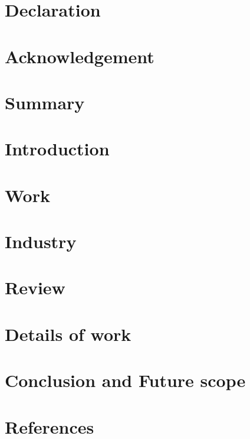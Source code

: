 \documentclass[12pt]{report}
\begin{document}




\chapter*{Declaration}


\chapter*{Acknowledgement}



\tableofcontents
\listoffigures

\clearpage
{}

\chapter{Summary}

\chapter{Introduction}

\chapter{Work}

\chapter{Industry}

\chapter{Review}

\chapter{Details of work}

\chapter{Conclusion and Future scope}

\chapter{References}

\end{document}

